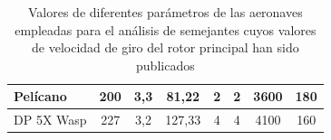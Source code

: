 \begin{table}[htbp]
\begin{tabular}{|l|c|c|c|c|c|c|c|}
		\hline
		\rowcolor[rgb]{ .949,  .949,  .949} Pelícano & \cellcolor[rgb]{ 1,  1,  1}200 & \cellcolor[rgb]{ 1,  1,  1}3,3 & \cellcolor[rgb]{ 1,  1,  1}81,22 & \cellcolor[rgb]{ 1,  1,  1}2 & \cellcolor[rgb]{ 1,  1,  1}2 & \cellcolor[rgb]{ 1,  1,  1}3600 & \cellcolor[rgb]{ 1,  1,  1}180 \\
		\hline
		\rowcolor[rgb]{ .949,  .949,  .949} DP 5X Wasp & \cellcolor[rgb]{ 1,  1,  1}227 & \cellcolor[rgb]{ 1,  1,  1}3,2 & \cellcolor[rgb]{ 1,  1,  1}127,33 & \cellcolor[rgb]{ 1,  1,  1}4 & \cellcolor[rgb]{ 1,  1,  1}4 & \cellcolor[rgb]{ 1,  1,  1}4100 & \cellcolor[rgb]{ 1,  1,  1}160 \\
		\hline
	\end{tabular}%
	\caption{Valores de diferentes parámetros de las aeronaves empleadas para el análisis de semejantes cuyos valores de velocidad de giro del rotor principal han sido publicados}
	\label{ASomega}
\end{table}%

